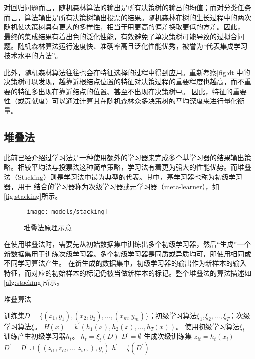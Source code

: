 对回归问题而言，随机森林算法的输出是所有决策树的输出的均值；而对分类任务而言，算法输出是所有决策树输出投票的结果。随机森林在树的生长过程中的两次随机使决策树具有更大的多样性，相当于用更高的偏差换取更低的方差。因此，
最终的集成结果有着出色的泛化性能，有效避免了单决策树可能导致的过拟合问题。随机森林算法运行速度快、准确率高且泛化性能优秀，被誉为“代表集成学习技术水平的方法”\cite{Zhou2016,Liu2018}。

此外，随机森林算法往往也会在特征选择的过程中得到应用\cite{Aurélien2018}。重新考察\autoref{fig:dt}中的决策树可以发现，越靠近根结点位置的特征对决策过程的重要程度也越高，而不重要的特征多出现在靠近结点的位置、甚至不出现在决策树中。
因此，特征的重要性（或贡献度）可以通过计算其在随机森林众多决策树的平均深度来进行量化衡量。

\subsection{堆叠法}
此前已经介绍过学习法是一种使用额外的学习器来完成多个基学习器的结果输出策略。相较平均法与投票法这种简单策略，学习法有着更为强大的性能优势。而堆叠法（Stacking）则是学习法中最为典型的代表。其中，基学习器也称为初级学习器，用于
结合的学习器称为次级学习器或元学习器（meta-learner），如\autoref{fig:stacking}所示。

\begin{figure}[htbp]
    \centering
    \texttt{[image: models/stacking]}
    \caption{\label{fig:stacking}堆叠法原理示意}
\end{figure}

在使用堆叠法时，需要先从初始数据集中训练出多个初级学习器，然后“生成”一个新数据集用于训练次级学习器。多个初级学习器是同质或异质均可，即使用相同或不同学习算法产生。
在新生成的数据集中，初级学习器的输出作为新样本的输入特征，而对应的初始样本的标记仍被当做新样本的标记。整个堆叠法的算法描述如\autoref{alg:stacking}所示。
\begin{breakablealgorithm}
    \caption[堆叠算法]{堆叠算法\cite{Zhou2016}}
    \label{alg:stacking}
    \begin{algorithmic}[1] %
        \Require 训练集$D=\{(x_1,y_1),(x_2,y_2),\dots,(x_m,y_m)\}$；初级学习算法$\xi_1,\xi_2,\dots,\xi_T$；次级学习算法$\xi$。
        \Ensure $H(x)=h^{'}(h_1(x),h_2(x),\dots,h_T(x))$。
            \State 使用初级学习算法$\xi_t$训练产生初级学习器$h_t$。
            \State $h_t=\xi_t (D)$
        \EndFor
        \State $D^{'}=\emptyset$
        \State 生成次级训练集
                \State $z_{it}=h_t(x_i)$
            \EndFor
            \State $D^{'}=D^{'} \cup ((z_{i1},z_{i2},\dots,z_{iT},),y_i)$
        \EndFor
        \State $h^{'}=\xi(D^{'})$
    \end{algorithmic}
\end{breakablealgorithm}

